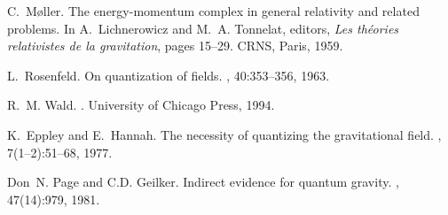 \documentclass[12pt]{amsart}
\theoremstyle{definition}
\theoremstyle{plain}
\begin{document}
\begin{thebibliography}{10}
C.~M{\o}ller.
\newblock The energy-momentum complex in general relativity and related
  problems.
\newblock In A.~Lichnerowicz and M.~A. Tonnelat, editors, {\em Les th\'eories
  relativistes de la gravitation}, pages 15--29. CRNS, Paris, 1959.

L.~Rosenfeld.
\newblock On quantization of fields.
, 40:353--356, 1963.

R.~M. Wald.
.
\newblock University of Chicago Press, 1994.

K.~Eppley and E.~Hannah.
\newblock The necessity of quantizing the gravitational field.
, 7(1--2):51--68, 1977.

Don~N. Page and C.D. Geilker.
\newblock Indirect evidence for quantum gravity.
, 47(14):979, 1981.

\end{thebibliography}
\end{document}
